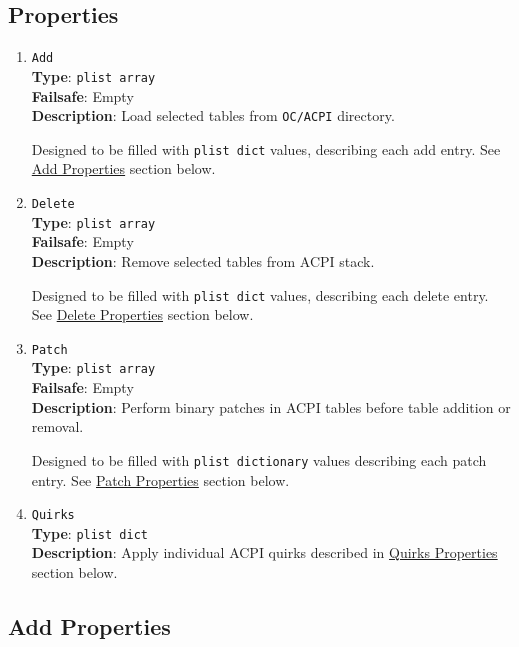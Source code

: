 \documentclass[]{article}
\begin{document}
\subsection{Properties}\label{acpiprops}

\begin{enumerate}
\item
  \texttt{Add}\\
  \textbf{Type}: \texttt{plist\ array}\\
  \textbf{Failsafe}: Empty\\
  \textbf{Description}: Load selected tables from \texttt{OC/ACPI}
  directory.

  Designed to be filled with \texttt{plist\ dict} values, describing each add entry.
  See \hyperref[acpipropsadd]{Add Properties} section below.

\item
  \texttt{Delete}\\
  \textbf{Type}: \texttt{plist\ array}\\
  \textbf{Failsafe}: Empty\\
  \textbf{Description}: Remove selected tables from ACPI stack.

  Designed to be filled with \texttt{plist\ dict} values, describing each delete entry.
  See \hyperref[acpipropsdelete]{Delete Properties} section below.

\item
  \texttt{Patch}\\
  \textbf{Type}: \texttt{plist\ array}\\
  \textbf{Failsafe}: Empty\\
  \textbf{Description}: Perform binary patches in ACPI tables before
  table addition or removal.

  Designed to be filled with \texttt{plist\ dictionary} values describing each
  patch entry. See \hyperref[acpipropspatch]{Patch Properties} section below.

\item
  \texttt{Quirks}\\
  \textbf{Type}: \texttt{plist\ dict}\\
  \textbf{Description}: Apply individual ACPI quirks described
  in \hyperref[acpipropsquirks]{Quirks Properties} section below.

\end{enumerate}

\subsection{Add Properties}\label{acpipropsadd}
\end{document}
